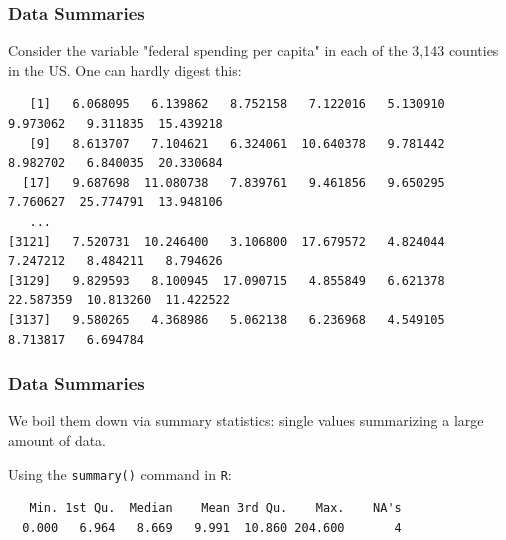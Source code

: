 \documentclass[slides]{beamer}
\newcommand{\blue}[1]{\textcolor{blue2}{#1}}
\begin{document}
\begin{frame}[fragile]
\frametitle{Data Summaries}

Consider the variable "federal spending per capita" in each of the 3,143 counties in the US.  One can hardly digest this:

\begin{tiny}
\begin{verbatim}
   [1]   6.068095   6.139862   8.752158   7.122016   5.130910   9.973062   9.311835  15.439218
   [9]   8.613707   7.104621   6.324061  10.640378   9.781442   8.982702   6.840035  20.330684
  [17]   9.687698  11.080738   7.839761   9.461856   9.650295   7.760627  25.774791  13.948106
   ...
[3121]   7.520731  10.246400   3.106800  17.679572   4.824044   7.247212   8.484211   8.794626
[3129]   9.829593   8.100945  17.090715   4.855849   6.621378  22.587359  10.813260  11.422522
[3137]   9.580265   4.368986   5.062138   6.236968   4.549105   8.713817   6.694784
\end{verbatim}
\end{tiny}

\end{frame}




\begin{frame}[fragile]
\frametitle{Data Summaries}
We boil them down via \blue{summary statistics}: single values summarizing a large amount of data.

\vspace{0.5cm}

\pause Using the \verb#summary()# command in \verb#R#:

\begin{small}
\begin{verbatim}
   Min. 1st Qu.  Median    Mean 3rd Qu.    Max.    NA's 
  0.000   6.964   8.669   9.991  10.860 204.600       4 
\end{verbatim}
\end{small}


\end{frame}
\end{document}
